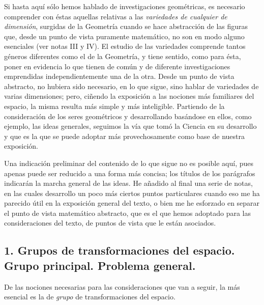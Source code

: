 \documentclass[a4paper, 12pt]{article}
\begin{document}
Si hasta aquí sólo hemos hablado de investigaciones geométricas, es necesario comprender con éstas aquellas relativas a las \textit{variedades de cualquier de dimensión}, surgidas de la Geometría cuando se hace abstracción de las figuras que, desde un punto de vista puramente matemático, no son en modo alguno esenciales (ver notas III y IV). El estudio de las variedades comprende tantos géneros diferentes como el de la Geometría, y tiene sentido, como para ésta, poner en evidencia lo que tienen de común y de diferente investigaciones emprendidas independientemente una de la otra. Desde un punto de vista abstracto, no hubiera sido necesario, en lo que sigue, sino hablar de variedades de varias dimensiones; pero, ciñendo la exposición a las nociones más familiares del espacio, la misma resulta más simple y más inteligible. Partiendo de la consideración de los seres geométricos y desarrollando basándose en ellos, como ejemplo, las ideas generales, seguimos la vía que tomó la Ciencia en su desarrollo y que es la que se puede adoptar más provechosamente como base de nuestra exposición.

Una indicación preliminar del contenido de lo que sigue no es posible aquí, pues apenas puede ser reducido a una forma más concisa; los títulos de los parágrafos indicarán la marcha general de las ideas. He añadido al final una serie de notas, en las cuales desarrollo un poco más ciertos puntos particulares cuando eso me ha parecido útil en la exposición general del texto, o bien me he esforzado en separar el punto \enlargethispage{0.5 cm}de vista matemático abstracto, que es el que hemos adoptado para las consideraciones del texto, de puntos de vista que le están asociados. 

 \subsection*{1. Grupos de transformaciones del espacio. Grupo principal. Problema general.}

De las nociones necesarias para las consideraciones que van a seguir, la más esencial es la de \textit{grupo} de transformaciones del espacio.
\end{document}
